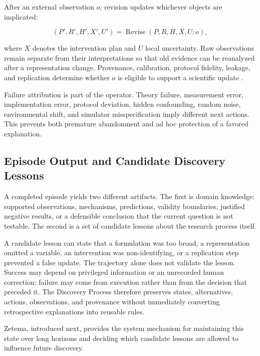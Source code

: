 \documentclass[11pt, a4paper, copyright]{google}
\begin{document}
After an external observation $o$, revision updates whichever objects are implicated:

\begin{equation}
(P',R',H',X',U')
=
\operatorname{Revise}(P,R,H,X,U;o),
\label{eq:evidence-grounded-revision}
\end{equation}

where $X$ denotes the intervention plan and $U$ local uncertainty. Raw observations remain separate from their interpretations so that old evidence can be reanalyzed after a representation change. Provenance, calibration, protocol fidelity, leakage, and replication determine whether $o$ is eligible to support a scientific update \citep{nosek2015top,wilkinson2016fair}.

Failure attribution is part of the operator. Theory failure, measurement error, implementation error, protocol deviation, hidden confounding, random noise, environmental shift, and simulator misspecification imply different next actions. This prevents both premature abandonment and ad hoc protection of a favored explanation.

\subsection{Episode Output and Candidate Discovery Lessons}
\label{subsec:learning-from-discovery}

A completed episode yields two different artifacts. The first is domain knowledge: supported observations, mechanisms, predictions, validity boundaries, justified negative results, or a defensible conclusion that the current question is not testable. The second is a set of candidate lessons about the research process itself.

A candidate lesson can state that a formulation was too broad, a representation omitted a variable, an intervention was non-identifying, or a replication step prevented a false update. The trajectory alone does not validate the lesson. Success may depend on privileged information or an unrecorded human correction; failure may come from execution rather than from the decision that preceded it. The Discovery Process therefore preserves states, alternatives, actions, observations, and provenance without immediately converting retrospective explanations into reusable rules.

Zetema, introduced next, provides the system mechanism for maintaining this state over long horizons and deciding which candidate lessons are allowed to influence future discovery.
\end{document}
